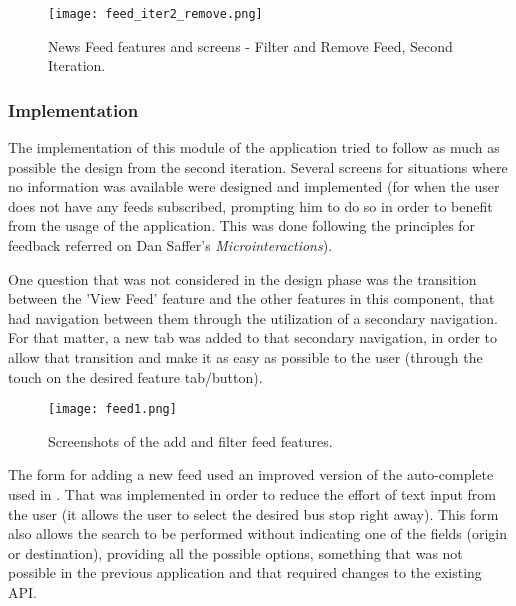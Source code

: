 \begin{figure}[H]
  \begin{center}
    \leavevmode
    \texttt{[image: feed\_iter2\_remove.png]}
    \caption{News Feed features and screens - Filter and Remove Feed, Second Iteration.}
    \label{fig:feed_iter2_remove}
  \end{center}
\end{figure}

\subsubsection{Implementation} 

The implementation of this module of the application tried to follow as much as possible the design from the second iteration. Several screens for situations where no information was available were designed and implemented (for when the user does not have any feeds subscribed, prompting him to do so in order to benefit from the usage of the application. This was done following the principles for feedback referred on Dan Saffer's \emph{Microinteractions}\cite{kn:Saffer}).

One question that was not considered in the design phase was the transition between the 'View Feed' feature and the other features in this component, that had navigation between them through the utilization of a secondary navigation. For that matter, a new tab was added to that secondary navigation, in order to allow that transition and make it as easy as possible to the user (through the touch on the desired feature tab/button).

\begin{figure}[!h]
  \begin{center}
    \leavevmode
    \texttt{[image: feed1.png]}
    \caption{Screenshots of the add and filter feed features.}
    \label{fig:feed1}
  \end{center}
\end{figure}

The form for adding a new feed used an improved version of the auto-complete used in \cite{kn:eSG12}. That was implemented in order to reduce the effort of text input from the user (it allows the user to select the desired bus stop right away). This form also allows the search to be performed without indicating one of the fields (origin or destination), providing all the possible options, something that was not possible in the previous application and that required changes to the existing API.

